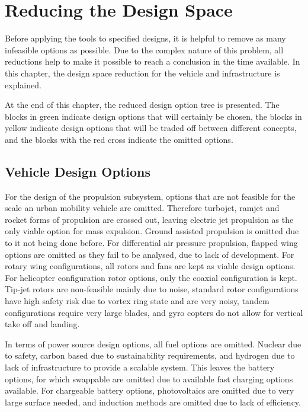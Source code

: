 \newpage
\chapter{Reducing the Design Space}
\label{ch-DS}

Before applying the tools to specified designs, it is helpful to remove as many infeasible options as possible. Due to the complex nature of this problem, all reductions help to make it possible to reach a conclusion in the time available. In this chapter, the design space reduction for the vehicle and infrastructure is explained.

At the end of this chapter, the reduced design option tree is presented. The blocks in green indicate design options that will certainly be chosen, the blocks in yellow indicate design options that will be traded off between different concepts, and the blocks with the red cross indicate the omitted options.

\section{Vehicle Design Options}
For the design of the propulsion subsystem, options that are not feasible for the scale an urban mobility vehicle are omitted. Therefore turbojet, ramjet and rocket forms of propulsion are crossed out, leaving electric jet propulsion as the only viable option for mass expulsion. Ground assisted propulsion is omitted due to it not being done before. For differential air pressure propulsion, flapped wing options are omitted as they fail to be analysed, due to lack of development. For rotary wing configurations, all rotors and fans are kept as viable design options. For helicopter configuration rotor options, only the coaxial configuration is kept. Tip-jet rotors are non-feasible mainly due to noise, standard rotor configurations have high safety risk due to vortex ring state and are very noisy, tandem configurations require very large blades, and gyro copters do not allow for vertical take off and landing. 

In terms of power source design options, all fuel options are omitted. Nuclear due to safety, carbon based due to sustainability requirements, and hydrogen due to lack of infrastructure to provide a scalable system. This leaves the battery options, for which swappable are omitted due to available fast charging options available. For chargeable battery options, photovoltaics are omitted due to very large surface needed, and induction methods are omitted due to lack of efficiency.

